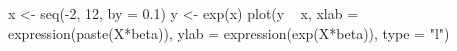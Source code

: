 \begin{Schunk}
\begin{Sinput}
 x <- seq(-2, 12, by = 0.1)
 y <- exp(x) 
 plot(y ~ x, xlab = expression(paste(X*beta)), ylab = expression(exp(X*beta)), type = "l")
\end{Sinput}
\end{Schunk}
